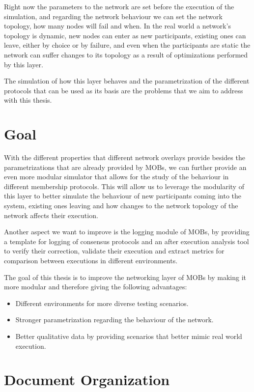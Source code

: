 Right now the parameters to the network are set before the execution of the simulation, and regarding the network behaviour we can
set the network topology, how many nodes will fail and when. In the real world a network's topology is dynamic, new nodes can enter
as new participants, existing ones can leave, either by choice or by failure, and even when the participants are static the network
can suffer changes to its topology as a result of optimizations performed by this layer.

The simulation of how this layer behaves and the parametrization of the different protocols that can be used as its basis are the
problems that we aim to address with this thesis.


\section{Goal}\label{sub:goal}

With the different properties that different network overlays provide besides the parametrizations that are already provided by MOBs,
we can further provide an even more modular simulator that allows for the study of the behaviour in different membership protocols.
This will allow us to leverage the modularity of this layer to better simulate the behaviour of new participants coming into the system, existing
ones leaving and how changes to the network topology of the network affects their execution.

Another aspect we want to improve is the logging module of MOBs, by providing a template for logging of consensus protocols and
an after execution analysis tool to verify their correction, validate their execution and extract metrics for
comparison between executions in different environments.

The goal of this thesis is to improve the networking layer of MOBs by making it more modular and therefore giving the following advantages:
\begin{itemize}
  \item Different environments for more diverse testing scenarios.
  \item Stronger parametrization regarding the behaviour of the network.
  \item Better qualitative data by providing scenarios that better mimic real world execution.
\end{itemize}

\section{Document Organization}\label{sub:document_organization}


